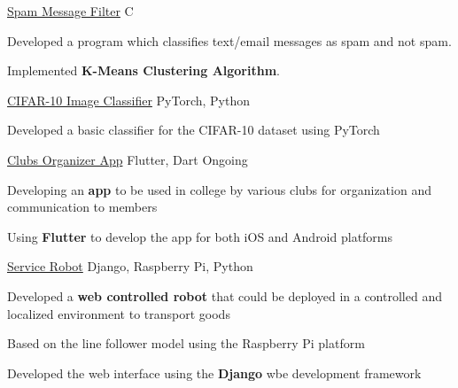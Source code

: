 \begin{cventries}
\projects
{} %
 {\href{}{Spam Message Filter}} %
 {C} %
 {} %
 {
   \begin{cvitems} %
     \item {Developed a program which classifies text/email messages as spam and not spam.}
     \item {Implemented \textbf{K-Means Clustering Algorithm}.}
   \end{cvitems}
 }

 \projects
{} %
 {\href{}{CIFAR-10 Image Classifier}} %
 {PyTorch, Python} %
 {} %
 {
   \begin{cvitems} %
     \item {Developed a basic classifier for the CIFAR-10 dataset using PyTorch}
   \end{cvitems}
 }
  


\projects
{} %
 {\href{}{Clubs Organizer App}} %
 {Flutter, Dart} %
 {Ongoing} %
 {
   \begin{cvitems} %
     \item {Developing an \textbf{app} to be used in college by various clubs for organization and communication to members}
     \item {Using \textbf{Flutter} to develop the app for both iOS and Android platforms}
   \end{cvitems}
 }

\projects
   {} %
    {\href{}{Service Robot}} %
    {Django, Raspberry Pi, Python} %
    {} %
    {
      \begin{cvitems} %
        \item {Developed a \textbf{web controlled robot} that could be deployed in a controlled and localized environment to transport goods}
        \item {Based on the line follower model using the Raspberry Pi platform}
        \item {Developed the web interface using the \textbf{Django} wbe development framework}
      \end{cvitems}
    }
  

\end{cventries}
